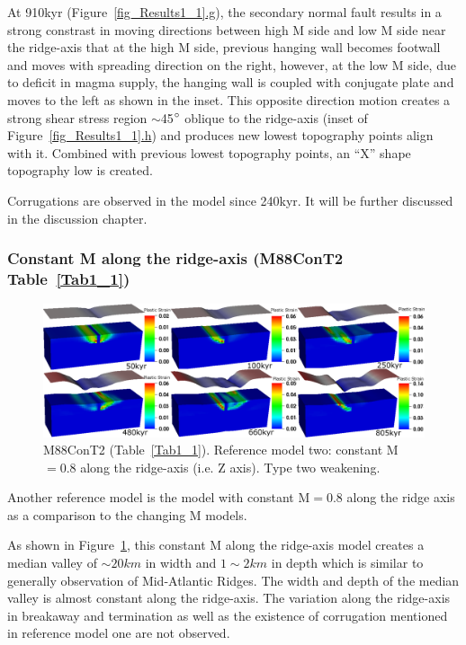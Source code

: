 At 910kyr (Figure~\hyperref[fig_Results1_1]{\ref{fig_Results1_1}.g}), the secondary normal fault results in a strong constrast in moving directions between high M side and low M side near the ridge-axis that at the high M side, previous hanging wall becomes footwall and moves with spreading direction on the right, however, at the low M side, due to deficit in magma supply, the hanging wall is coupled with conjugate plate and moves to the left as shown in the inset. This opposite direction motion creates a strong shear stress region $\sim$45$\degree$ oblique to the ridge-axis (inset of Figure~\hyperref[fig_Results1_1]{\ref{fig_Results1_1}.h}) and produces new lowest topography points align with it. Combined with previous lowest topography points, an ``X'' shape topography low is created.

Corrugations are observed in the model since 240kyr. It will be further discussed in the discussion chapter.

\subsubsection{Constant M along the ridge-axis (M88ConT2 Table~\hyperref[Tab1_1]{\ref{Tab1_1}})}

\begin{figure}[h]
  \centering
    \includegraphics[width=1.0\textwidth]{./Figures/fig_Results1_3.eps}
  \caption{M88ConT2 (Table~\hyperref[Tab1_1]{\ref{Tab1_1}}). Reference model two: constant M$=0.8$ along the ridge-axis (i.e. Z axis). Type two weakening.}
 \label{fig_Results1_3}
\end{figure}   

Another reference model is the model with constant M$=0.8$ along the ridge axis as a comparison to the changing M models.

As shown in Figure~\hyperref[fig_Results1_3]{\ref{fig_Results1_3}}, this constant M along the ridge-axis model creates a median valley of $\sim 20km$ in width and $1\sim2km$ in depth which is similar to generally observation of Mid-Atlantic Ridges. The width and depth of the median valley is almost constant along the ridge-axis. The variation along the ridge-axis in breakaway and termination as well as the existence of corrugation mentioned in reference model one are not observed. 

